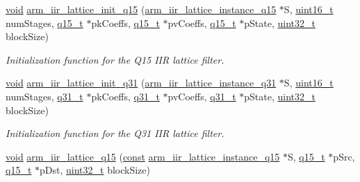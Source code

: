 \begin{DoxyCompactItemize}
\hyperlink{group___n_a_m_e_ga18028b8badbf1ea7e704ccac3c488e82}{void} \hyperlink{group___i_i_r___lattice_ga1f4bc2dd3d5641e96815d3a5aad58998}{arm\-\_\-iir\-\_\-lattice\-\_\-init\-\_\-q15} (\hyperlink{structarm__iir__lattice__instance__q15}{arm\-\_\-iir\-\_\-lattice\-\_\-instance\-\_\-q15} $\ast$S, \hyperlink{stdint_8h_a273cf69d639a59973b6019625df33e30}{uint16\-\_\-t} num\-Stages, \hyperlink{arm__math_8h_ab5a8fb21a5b3b983d5f54f31614052ea}{q15\-\_\-t} $\ast$pk\-Coeffs, \hyperlink{arm__math_8h_ab5a8fb21a5b3b983d5f54f31614052ea}{q15\-\_\-t} $\ast$pv\-Coeffs, \hyperlink{arm__math_8h_ab5a8fb21a5b3b983d5f54f31614052ea}{q15\-\_\-t} $\ast$p\-State, \hyperlink{stdint_8h_a435d1572bf3f880d55459d9805097f62}{uint32\-\_\-t} block\-Size)
\begin{DoxyCompactList}\small\item\em Initialization function for the Q15 I\-I\-R lattice filter. \end{DoxyCompactList}\item 
\hyperlink{group___n_a_m_e_ga18028b8badbf1ea7e704ccac3c488e82}{void} \hyperlink{group___i_i_r___lattice_gab686c14175581797d9c3ad7bf1d5cc1e}{arm\-\_\-iir\-\_\-lattice\-\_\-init\-\_\-q31} (\hyperlink{structarm__iir__lattice__instance__q31}{arm\-\_\-iir\-\_\-lattice\-\_\-instance\-\_\-q31} $\ast$S, \hyperlink{stdint_8h_a273cf69d639a59973b6019625df33e30}{uint16\-\_\-t} num\-Stages, \hyperlink{arm__math_8h_adc89a3547f5324b7b3b95adec3806bc0}{q31\-\_\-t} $\ast$pk\-Coeffs, \hyperlink{arm__math_8h_adc89a3547f5324b7b3b95adec3806bc0}{q31\-\_\-t} $\ast$pv\-Coeffs, \hyperlink{arm__math_8h_adc89a3547f5324b7b3b95adec3806bc0}{q31\-\_\-t} $\ast$p\-State, \hyperlink{stdint_8h_a435d1572bf3f880d55459d9805097f62}{uint32\-\_\-t} block\-Size)
\begin{DoxyCompactList}\small\item\em Initialization function for the Q31 I\-I\-R lattice filter. \end{DoxyCompactList}\item 
\hyperlink{group___n_a_m_e_ga18028b8badbf1ea7e704ccac3c488e82}{void} \hyperlink{group___i_i_r___lattice_gaeb9e9599a288832ed123183eaa8b294a}{arm\-\_\-iir\-\_\-lattice\-\_\-q15} (\hyperlink{group___n_a_m_e_ga7ae6d0e43244213b34de2c2b9aa30da6}{const} \hyperlink{structarm__iir__lattice__instance__q15}{arm\-\_\-iir\-\_\-lattice\-\_\-instance\-\_\-q15} $\ast$S, \hyperlink{arm__math_8h_ab5a8fb21a5b3b983d5f54f31614052ea}{q15\-\_\-t} $\ast$p\-Src, \hyperlink{arm__math_8h_ab5a8fb21a5b3b983d5f54f31614052ea}{q15\-\_\-t} $\ast$p\-Dst, \hyperlink{stdint_8h_a435d1572bf3f880d55459d9805097f62}{uint32\-\_\-t} block\-Size)

\end{DoxyCompactItemize}
